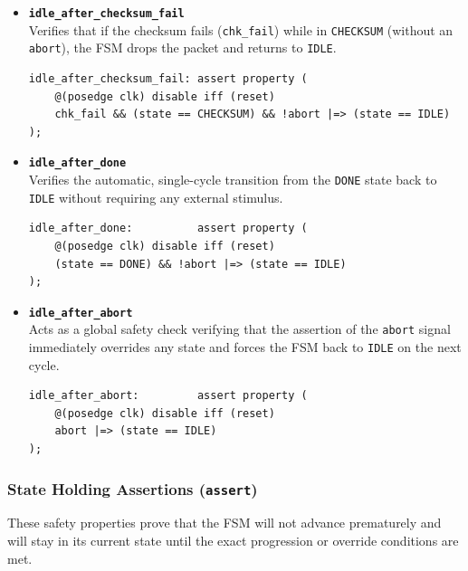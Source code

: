 \documentclass{article}
\begin{document}
\begin{itemize}
    \item \textbf{\texttt{idle\_after\_checksum\_fail}} \\
    Verifies that if the checksum fails (\texttt{chk\_fail}) while in \texttt{CHECKSUM} (without an \texttt{abort}), the FSM drops the packet and returns to \texttt{IDLE}.
    \begin{verbatim}
idle_after_checksum_fail: assert property (
    @(posedge clk) disable iff (reset) 
    chk_fail && (state == CHECKSUM) && !abort |=> (state == IDLE)
);
    \end{verbatim}
    
    \item \textbf{\texttt{idle\_after\_done}} \\
    Verifies the automatic, single-cycle transition from the \texttt{DONE} state back to \texttt{IDLE} without requiring any external stimulus.
    \begin{verbatim}
idle_after_done:          assert property (
    @(posedge clk) disable iff (reset) 
    (state == DONE) && !abort |=> (state == IDLE)
);
    \end{verbatim}
    
    \item \textbf{\texttt{idle\_after\_abort}} \\
    Acts as a global safety check verifying that the assertion of the \texttt{abort} signal immediately overrides any state and forces the FSM back to \texttt{IDLE} on the next cycle.
    \begin{verbatim}
idle_after_abort:         assert property (
    @(posedge clk) disable iff (reset) 
    abort |=> (state == IDLE)
);
    \end{verbatim}
\end{itemize}

\subsubsection{State Holding Assertions (\texttt{assert})}
These safety properties prove that the FSM will not advance prematurely and will stay in its current state until the exact progression or override conditions are met.
\end{document}
